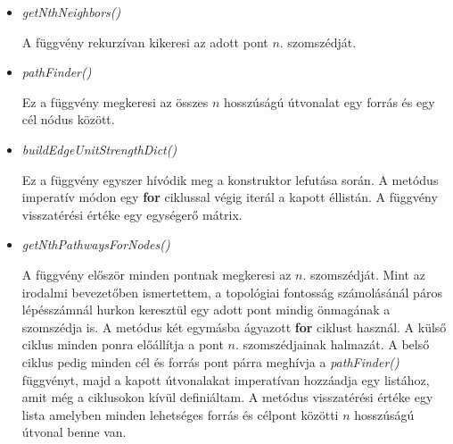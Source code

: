 \documentclass[a4paper,12pt]{article}
\begin{document}
		\begin{itemize}
			\item \textit{getNthNeighbors()}
			
			A függvény rekurzívan kikeresi az adott pont $n$. szomszédját.
			
			\pagebreak
		
			\item \textit{pathFinder()}
			
			Ez a függvény megkeresi az összes $n$ hosszúságú útvonalat egy forrás és egy cél nódus között.
			
			  		\begin{algorithm}[H]
						\footnotesize
						
						\SetAlgoVlined
						
						
						
			  		\end{algorithm}
			  		
			\item \textit{buildEdgeUnitStrengthDict()}
			
			Ez a függvény egyszer hívódik meg a konstruktor lefutása során. A metódus imperatív módon egy \textbf{for} ciklussal végig iterál a kapott éllistán. A függvény visszatérési értéke egy egységerő mátrix.
			  		
			\item \textit{getNthPathwaysForNodes()}
			
			A függvény először minden pontnak megkeresi az $n$. szomszédját.  Mint az irodalmi bevezetőben ismertettem, a topológiai fontosság számolásánál páros lépésszámnál hurkon keresztül egy adott pont mindig önmagának a szomszédja is. A metódus két egymásba ágyazott \textbf{for} ciklust használ. A külső ciklus minden ponra előállítja a pont $n$. szomszédjainak halmazát. A belső ciklus pedig minden cél és forrás pont párra meghívja a \textit{pathFinder()} függvényt, majd a kapott útvonalakat imperatívan hozzáadja egy listához, amit még a ciklusokon kívül definiáltam. A metódus visszatérési értéke egy lista amelyben minden lehetséges forrás és célpont közötti $n$ hosszúságú útvonal benne van.
			

\end{itemize}
\end{document}
